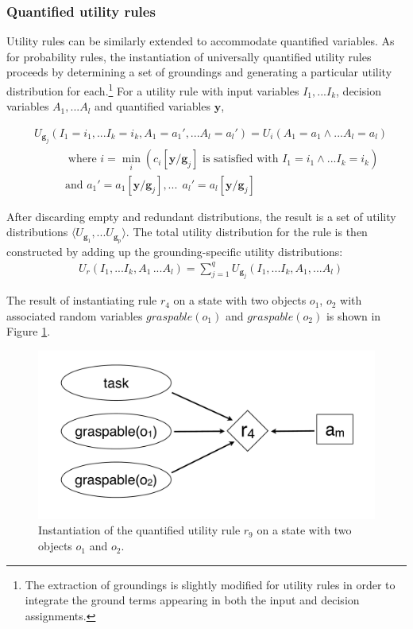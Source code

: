 \subsubsection*{Quantified utility rules}

Utility rules can be similarly extended to accommodate quantified variables. As for probability rules, the instantiation of universally quantified utility rules proceeds by determining a set of groundings and generating a particular utility distribution for each.\footnote{The extraction of groundings is slightly modified for utility rules in order to integrate the ground terms appearing in both the input and decision assignments.}
 For a utility rule with input variables $I_1,...I_k$, decision variables $A_1,...A_l$ and quantified variables $\mathbf{y}$,
 
 \begin{align}
& U_{\mathbf{g}_j}(I_1\!=\!i_1,... I_k\!=\!i_k, A_1\!=\!a_1',... A_l\!=\!a_l') = U_i(A_1\!=\!a_1 \land... A_l\!=\!a_l) 
 \\
& \; \; \; \; \; \; \; \;   \; \; \;\text{where } i = \min_i (c_i[\mathbf{y} / \mathbf{g}_j]\text{ is satisfied with } I_1\!=\!i_1 \land ... I_k\!=\!i_k) \nonumber \\
& \; \; \; \; \; \; \; \;   \; \;  \text{and } a_1' = a_1[\mathbf{y} / \mathbf{g}_j], ... \ \ a_l' = a_l[\mathbf{y} / \mathbf{g}_j] \nonumber
\end{align}

After discarding empty and redundant distributions, the result is a set of utility distributions $ \langle U_{\mathbf{g}_1},... U_{\mathbf{g}_p} \rangle$. The total utility distribution for the rule is then constructed by adding up the grounding-specific utility distributions:   
\begin{align}
& U_{r}(I_1,... I_k, A_1\,... A_l) = \sum_{j=1}^{q} U_{\mathbf{g}_j}(I_1,... I_k, A_1,... A_l) \label{eq:quantifruledistrib}
\end{align}


The result of instantiating rule $r_4$ on a state with two objects $o_1$, $o_2$ with associated random variables $\mathit{graspable}(o_1)$ and $\mathit{graspable}(o_2)$ is shown in Figure  \ref{fig:quantinstantitionutil}.  

\begin{figure}[h]
\centering
\includegraphics[scale=0.25]{imgs/quantutilruleinstantiation.pdf}
\caption{Instantiation of the quantified utility rule $r_9$ on a state with two objects $o_1$ and $o_2$.}
\label{fig:quantinstantitionutil}
\end{figure}

